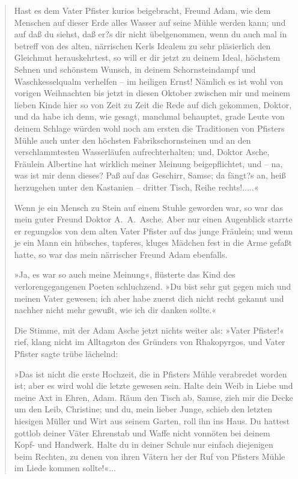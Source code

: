 \begin{verse}
Hast es dem Vater Pfister kurios beigebracht, Freund Adam, wie dem
Menschen auf dieser Erde alles Wasser auf seine Mühle werden kann;
und auf daß du siehst, daß er?s dir nicht übelgenommen, wenn du
auch mal in betreff von des alten, närrischen Kerls Idealem zu sehr
pläsierlich den Gleichmut herauskehrtest, so will er dir jetzt zu
deinem Ideal, höchstem Sehnen und schönstem Wunsch, in deinem
Schornsteindampf und Waschkesselqualm verhelfen – im heiligen
Ernst! Nämlich es ist wohl von vorigen Weihnachten bis jetzt in
diesen Oktober zwischen mir und meinem lieben Kinde hier so von
Zeit zu Zeit die Rede auf dich gekommen, Doktor, und da habe ich
denn, wie gesagt, manchmal behauptet, grade Leute von deinem
Schlage würden wohl noch am ersten die Traditionen von Pfisters
Mühle auch unter den höchsten Fabrikschornsteinen und an den
verschlammtesten Wasserläufen aufrechterhalten; und, Doktor Asche,
Fräulein Albertine hat wirklich meiner Meinung beigepflichtet, und
– na, was ist mir denn dieses? Paß auf das Geschirr, Samse; da
fängt?s an, heiß herzugehen unter den Kastanien – dritter Tisch,
Reihe rechts!.....«

Wenn je ein Mensch zu Stein auf einem Stuhle geworden war, so war
das mein guter Freund Doktor A.~A.~Asche. Aber nur einen Augenblick
starrte er regungslos von dem alten Vater Pfister auf das junge
Fräulein; und wenn je ein Mann ein hübsches, tapferes, kluges
Mädchen fest in die Arme gefaßt hatte, so war das mein närrischer
Freund Adam ebenfalls.

»Ja, es war so auch meine Meinung«, flüsterte das Kind des
verlorengegangenen Poeten schluchzend. »Du bist sehr gut gegen mich
und meinen Vater gewesen; ich aber habe zuerst dich nicht recht
gekannt und nachher nicht mehr gewußt, wie ich dir danken sollte.«

Die Stimme, mit der Adam Asche jetzt nichts weiter als: »Vater
Pfister!« rief, klang nicht im Alltagston des Gründers von
Rhakopyrgos, und Vater Pfister sagte trübe lächelnd:

»Das ist nicht die erste Hochzeit, die in Pfisters Mühle verabredet
worden ist; aber es wird wohl die letzte gewesen sein. Halte dein
Weib in Liebe und meine Axt in Ehren, Adam. Räum den Tisch ab,
Samse, zieh mir die Decke um den Leib, Christine; und du, mein
lieber Junge, schieb den letzten hiesigen Müller und Wirt aus
seinem Garten, roll ihn ins Haus. Du hattest gottlob deiner Väter
Ehrenstab und Waffe nicht vonnöten bei deinem Kopf- und Handwerk.
Halte du in deiner Schule nur einfach diejenigen beim Rechten, zu
denen von ihren Vätern her der Ruf von Pfisters Mühle im Liede
kommen sollte!«...


\end{verse}
